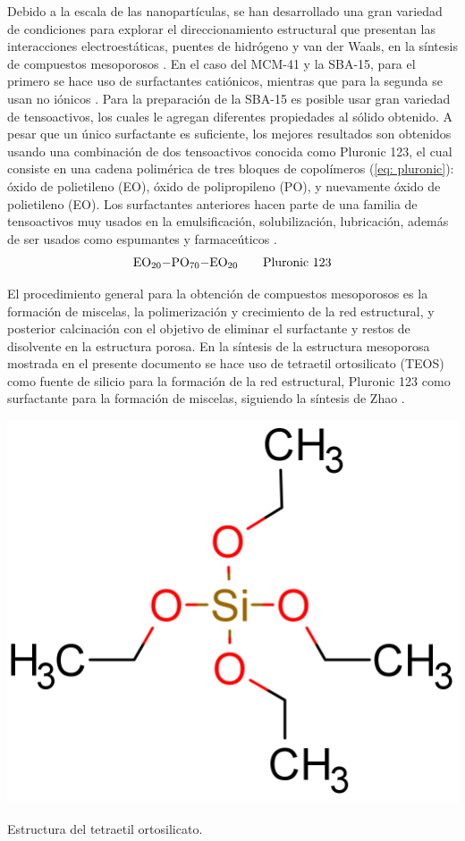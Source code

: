 \documentclass[fleqn,11pt]{SelfArx}
\begin{document}
	Debido a la escala de las nanopart\'iculas, se han desarrollado una gran variedad de condiciones para explorar el direccionamiento estructural que presentan las interacciones electroest\'aticas, puentes de hidr\'ogeno y van der Waals, en la s\'intesis de compuestos mesoporosos \cite{zhao_1998}. En el caso del MCM-41 y la SBA-15, para el primero se hace uso de surfactantes cati\'onicos, mientras que para la segunda se usan no i\'onicos \cite{zhao_1998}. Para la preparaci\'on de la SBA-15 es posible usar gran variedad de tensoactivos, los cuales le agregan diferentes propiedades al s\'olido obtenido. A pesar que un \'unico surfactante es suficiente, los mejores resultados son obtenidos usando una combinaci\'on de dos tensoactivos conocida como Pluronic 123, el cual consiste en una cadena polim\'erica de tres bloques de copol\'imeros (\autoref{eq: pluronic}): \'oxido de polietileno (EO), \'oxido de polipropileno (PO), y nuevamente \'oxido de polietileno (EO). Los surfactantes anteriores hacen parte de una familia de tensoactivos muy usados en la emulsificaci\'on, solubilizaci\'on, lubricaci\'on, adem\'as de ser usados como espumantes y farmace\'uticos \cite{zhao_1998}.
	\begin{equation} \label{eq: pluronic}
	\ce{EO_{20}-PO_{70}-EO_{20}} \qquad \text{Pluronic 123}
	\end{equation}
	
	El procedimiento general para la obtenci\'on de compuestos mesoporosos es la formaci\'on de miscelas, la polimerizaci\'on y crecimiento de la red estructural, y posterior calcinaci\'on con el objetivo de eliminar el surfactante y restos de disolvente en la estructura porosa.	En la s\'intesis de la estructura mesoporosa mostrada en el presente documento se hace uso de tetraetil ortosilicato (TEOS) como fuente de silicio para la formaci\'on de la red estructural, Pluronic 123 como surfactante para la formaci\'on de miscelas, siguiendo la s\'intesis de Zhao \cite{zhao_1998}.
	
	\begin{scheme}[h]
		\centering
		\includegraphics[width=0.4\linewidth]{structures/silicate.png}
		
		\caption{Estructura del tetraetil ortosilicato.}
		\label{scheme: sources}
	\end{scheme}
	
\end{document}
